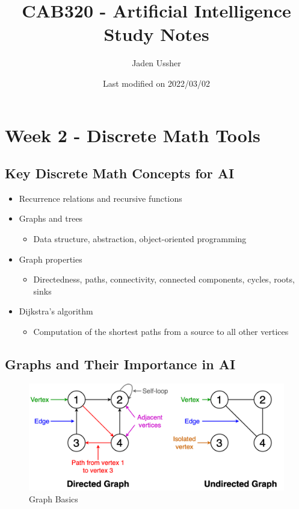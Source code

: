 \documentclass[8pt]{article}
\title{CAB320 - Artificial Intelligence Study Notes}
\author{Jaden Ussher}
\date{Last modified on 2022/03/02}
\begin{document}
\maketitle
\small
\newpage

\tableofcontents

\newpage
\section{Week 2 - Discrete Math Tools}
\subsection{Key Discrete Math Concepts for AI}
\begin{itemize}
    \item Recurrence relations and recursive functions
    \item Graphs and trees
    \begin{itemize}
        \item Data structure, abstraction, object-oriented programming
    \end{itemize}
    \item Graph properties
    \begin{itemize}
        \item Directedness, paths, connectivity, connected components, cycles, roots, sinks
    \end{itemize}
    \item Dijkstra's algorithm
    \begin{itemize}
        \item Computation of the shortest paths from a source to all other vertices
    \end{itemize}
\end{itemize}

\subsection{Graphs and Their Importance in AI}
\begin{figure}[h]
    \centering
    \includegraphics[width=0.5\linewidth]{images/1_xpy7aax3dIU12HVrGd_siQ.png}
    \caption{Graph Basics}
    \label{fig:enter-label}
\end{figure}
\end{document}
